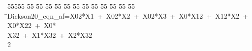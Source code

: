 %
%
\begin{tabbing}
55555 \= 55 \= 55 \= 55 \= 55 \= 55 \= 55 \= 55 \= 55 \= 55 \= 55 \= 55 \= 55 \= \>Dickson20\_eqn\_af=X02*X1\ +\ X02*X2\ +\ X02*X3\ +\ X0*X12\ +\ X12*X2\ +\ X0*X22\ +\ X0*\\[0pt]
\>X32\ +\ X1*X32\ +\ X2*X32\\[0pt]
2\>\end{tabbing}
